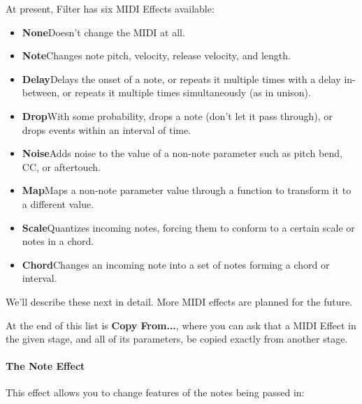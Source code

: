 \documentclass[twoside,10pt]{article}
\begin{document}
At present, Filter has six MIDI Effects available:

\begin{itemize}
\item {\bf None}\qquad Doesn't change the MIDI at all.
\item {\bf Note}\qquad Changes note pitch, velocity, release velocity, and length.
\item {\bf Delay}\qquad Delays the onset of a note, or repeats it multiple times with a delay in-between, or repeats it multiple times simultaneously (as in unison).
\item {\bf Drop}\qquad With some probability, drops a note (don't let it pass through), or drops events within an interval of time.
\item {\bf Noise}\qquad Adds noise to the value of a non-note parameter such as pitch bend, CC, or aftertouch.
\item {\bf Map}\qquad Maps a non-note parameter value through a function to transform it to a different value.
\item {\bf Scale}\qquad Quantizes incoming notes, forcing them to conform to a certain scale or notes in a chord.
\item {\bf Chord}\qquad Changes an incoming note into a set of notes forming a chord or interval.
\end{itemize}

We'll describe these next in detail.  More MIDI effects are planned for the future.

At the end of this list is {\bf Copy From...}, where you can ask that a MIDI Effect in the given stage, and all of its parameters, be copied exactly from another stage.

\paragraph{The Note Effect}

This effect allows you to change features of the notes being passed in:
\end{document}
